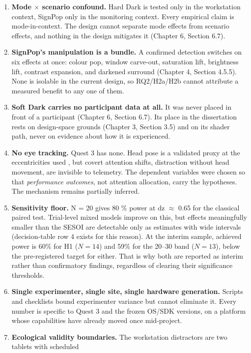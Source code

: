 \begin{enumerate}
\item \textbf{Mode $\times$ scenario confound.} Hard Dark is tested only in the workstation context, SignPop only
   in the monitoring context. Every empirical claim is mode-in-context. The design cannot separate
   mode effects from scenario effects, and nothing in the design mitigates it (Chapter 6,
   Section 6.7).
\item \textbf{SignPop's manipulation is a bundle.} A confirmed detection switches on six effects at
   once: colour pop, window carve-out, saturation lift, brightness lift, contrast expansion, and
   darkened surround (Chapter 4, Section 4.5.5). None is isolable in the current design, so
   RQ2/H2a/H2b cannot attribute a measured benefit to any one of them.
\item \textbf{Soft Dark carries no participant data at all.} It was never placed in front of a
   participant (Chapter 6, Section 6.7). Its place in the dissertation rests on design-space
   grounds (Chapter 3, Section 3.5) and on its shader path, never on evidence about how it is
   experienced.
\item \textbf{No eye tracking.} Quest 3 has none. Head pose is a validated proxy at the eccentricities used
   \citep{higgins2022,sitzmann2018}, but covert attention shifts, distraction without
   head movement, are invisible to telemetry. The dependent variables were chosen so that
   \textit{performance outcomes}, not attention allocation, carry the hypotheses. The mechanism remains
   partially inferred.
\item \textbf{Sensitivity floor.} N = 20 gives 80 \% power at dz $\approx$ 0.65 for the classical paired test.
   Trial-level mixed models improve on this, but effects meaningfully smaller than the SESOI are
   detectable only as estimates with wide intervals (decision-table row 4 exists for this reason). At
   the interim sample, achieved power is 60\% for H1 ($N = 14$) and 59\% for the 20--30\textdegree{}
   band ($N = 13$), below the pre-registered target for either. That is why both are reported as interim rather than
   confirmatory findings, regardless of clearing their significance thresholds.
\item \textbf{Single experimenter, single site, single hardware generation.} Scripts and checklists bound
   experimenter variance but cannot eliminate it. Every number is specific to Quest 3 and the
   frozen OS/SDK versions, on a platform whose capabilities have already moved once mid-project.
\item \textbf{Ecological validity boundaries.} The workstation distractors are two tablets with scheduled

\end{enumerate}
